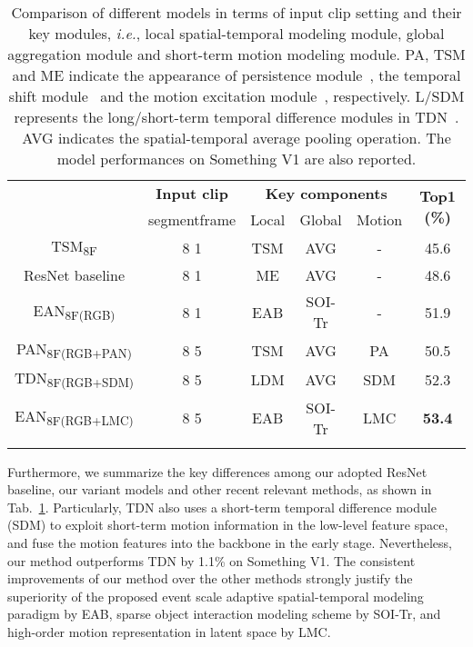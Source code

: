 		\begin{table}[!tb]
			\caption{Comparison of different models in terms of input clip setting and their key modules, \textit{i.e.}, local spatial-temporal modeling module, global aggregation module and short-term motion modeling module.
				PA, TSM and ME indicate the appearance of persistence module~\cite{zhang2020pan}, the temporal shift module~\cite{lin2019tsm} and 
				the motion excitation module~\cite{li2020tea}, respectively. 
				L/SDM represents the long/short-term temporal difference modules in TDN~\cite{wang2020tdn}.
				AVG indicates the spatial-temporal average pooling operation.
				The model performances on Something V1 are also reported.
			}
		\centering
			\renewcommand{\arraystretch}{1.0}
			\setlength{\tabcolsep}{0.7mm}
			\begin{tabular}{cccccc}
				\Xhline{2\arrayrulewidth}
				\multirow{2}{*}{\textbf{Model}}& \multicolumn{1}{c}{\textbf{Input clip}} & \multicolumn{3}{c}{\textbf{Key components}} &
				\multirow{2}{*}{\textbf{Top1 (\%)}}
				 \\
				& segmentframe  & Local   & Global  & Motion\\  
				\hline
				TSM\textsubscript{8F} & 8  1 & TSM & AVG &- & 45.6 \\
				ResNet baseline & 8  1 & ME & AVG &- & 48.6 \\
				
				EAN\textsubscript{8F(RGB)} & 8  1 & EAB & SOI-Tr &- &51.9 \\ 
				\hline
				PAN\textsubscript{8F(RGB+PAN)} & 8  5 & TSM & AVG & PA & 50.5 \\ 
				TDN\textsubscript{8F(RGB+SDM)} & 8  5 & LDM & AVG & SDM & 52.3\\
				EAN\textsubscript{8F(RGB+LMC)} & 8  5 & EAB & SOI-Tr & LMC & \textbf{53.4} \\ 
				
				\Xhline{2\arrayrulewidth}
			\end{tabular}
		
		\label{tab_method_compare}
	
\end{table}

Furthermore, we summarize the key differences among our adopted ResNet baseline, our variant models and
other recent relevant methods, as shown in Tab.~\ref{tab_method_compare}.
Particularly, TDN also uses a short-term temporal difference module (SDM) to exploit short-term motion information in the low-level feature space, and fuse the motion features into the backbone in the early stage. Nevertheless, our method outperforms TDN by 1.1\% on Something V1.
The consistent improvements of our method over the other methods strongly justify the superiority of the proposed event scale adaptive spatial-temporal modeling paradigm by EAB, sparse object interaction modeling scheme by SOI-Tr, and high-order motion representation in latent space by LMC.








